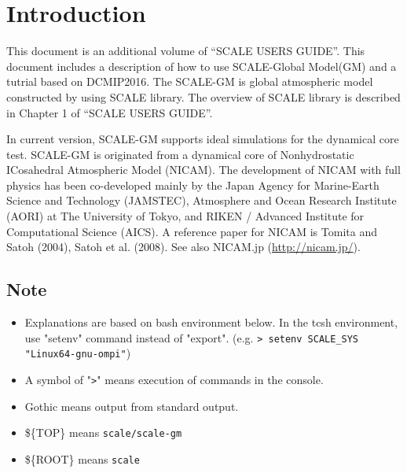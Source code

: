 \section{Introduction}

This document is an additional volume of ``SCALE USERS GUIDE''.
This document includes a description of how to use SCALE-Global Model(GM) and a tutrial based on DCMIP2016.
The SCALE-GM is global atmospheric model constructed by using SCALE library.
The overview of SCALE library is described in Chapter 1 of ``SCALE USERS GUIDE''.

In current version, SCALE-GM supports ideal simulations for the dynamical core test.
SCALE-GM is originated from a dynamical core of Nonhydrostatic ICosahedral Atmospheric Model (NICAM).
The development of NICAM with full physics has been co-developed mainly by
the Japan Agency for Marine-Earth Science and Technology (JAMSTEC), Atmosphere
and Ocean Research Institute (AORI) at The University of Tokyo, and RIKEN / Advanced
Institute for Computational Science (AICS). A reference paper for NICAM is
Tomita and Satoh (2004), Satoh et al. (2008). See also NICAM.jp (\url{http://nicam.jp/}).

\subsection{Note}
 \begin{itemize}
   \item Explanations are based on bash environment below.
         In the tcsh environment, use "setenv" command instead of "export".
         (e.g. \verb|> setenv SCALE_SYS "Linux64-gnu-ompi"|)
   \item A symbol of "\verb|>|" means execution of commands in the console.
   \item Gothic means output from standard output.
   \item \$\{TOP\}   means \verb|scale/scale-gm|
   \item \$\{ROOT\}  means \verb|scale|
 \end{itemize}


